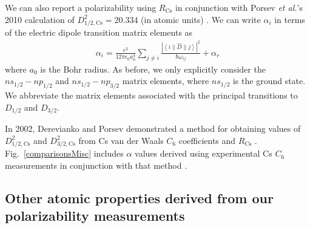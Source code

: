 \documentclass[twocolumn,pra,showpacs,superscriptaddress,longbibliography]{revtex4-1}   %
\newcommand{\brakett}[3]{\left.\left\langle#1\right.\right.\|#2\|\left.\left.#3\right\rangle\right.}
\newcommand{\figref}[1]{Fig.~\ref{#1}}
\newcommand{\rcs}{R_{\mathrm{Cs}}}
\newcommand{\etal}{\textit{et al.}}
\begin{document}



We can also report a polarizability using $\rcs$ \cite{Rafac1998} in conjunction with Porsev \etal's 2010 calculation of $D_{1/2,\mathrm{Cs}}^2 = 20.334$ (in atomic units) \cite{Porsev2010}.
We can write $\alpha_i$ in terms of the electric dipole transition matrix elements as
\begin{align}
	\alpha_i = \frac{e^2}{12 \pi \epsilon_0 a_0^4} \sum_{j\neq i}	
	\frac{\left|\brakett{i}{\hat{D}}{j}\right|^2}{\hbar\omega_{ij}}	
	+ \alpha_r
	\label{polFromMatrixElements}
\end{align}
where $a_0$ is the Bohr radius. 
As before, we only explicitly consider the $ns_{1/2}-np_{1/2}$ and $ns_{1/2}-np_{3/2}$ matrix elements, 
where $ns_{1/2}$ is the ground state.
We abbreviate the matrix elements associated with the principal transitions to $D_{1/2}$ and $D_{3/2}$.

In 2002, Derevianko and Porsev demonstrated a method for obtaining values of $D_{1/2,\mathrm{Cs}}^2$ and $D_{3/2,\mathrm{Cs}}^2$ from Cs van der Waals $C_6$ coefficients \cite{Derevianko2001} and $\rcs$ \cite{Rafac1998}. \figref{comparisonsMisc} includes $\alpha$ values derived using experimental Cs $C_6$ measurements in conjunction with that method \cite{Leo2000,Chin2004}.



\subsection{Other atomic properties derived from our polarizability measurements} \label{sectionDerivedProperties}
\end{document}
